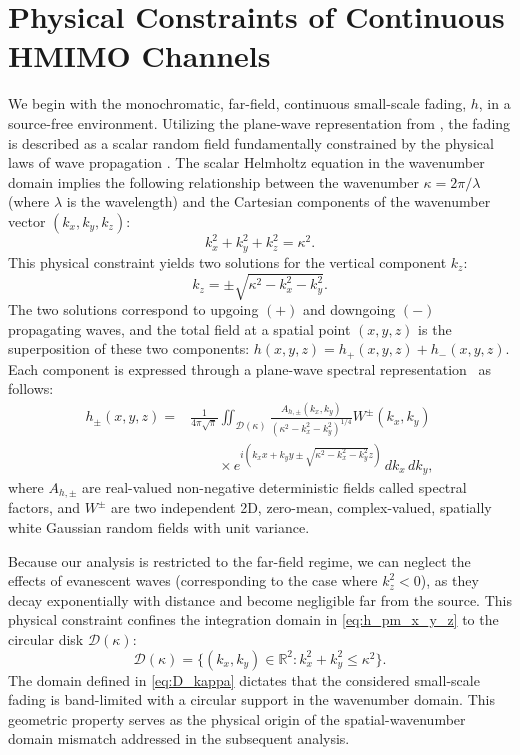 \documentclass[lettersize,journal]{IEEEtran}
\theoremstyle{plain}
\begin{document}
\section{Physical Constraints of Continuous HMIMO Channels}
\label{sec:Continuous small-scale fading model}
We begin with the monochromatic, far-field, continuous small-scale fading, $h$, in a source-free environment. Utilizing the plane-wave representation from \cite{Pizzo2020Spatially}, the fading is described as a scalar random field fundamentally constrained by the physical laws of wave propagation \cite{Paulraj2003Introduction}. The scalar Helmholtz equation in the wavenumber domain \cite{hildebrand1962advanced} implies the following relationship between the wavenumber $\kappa = 2\pi/\lambda$ (where $\lambda$ is the wavelength) and the Cartesian components of the wavenumber vector $(k_x, k_y, k_z)$:
$$
k_x^2 + k_y^2 + k_z^2 = \kappa^2.
\label{eq:k_x_k_y_k_z}
$$
This physical constraint yields two solutions for the vertical component $k_z$:
$$
k_z = \pm\sqrt{\kappa^2 - k_x^2 - k_y^2}.
\label{eq:k_z}
$$
The two solutions correspond to upgoing $(+)$ and downgoing $(-)$ propagating waves, and the total field at a spatial point $(x,y,z)$ is the superposition of these two components: $h(x, y, z) = h_{+}(x, y, z) + h_{-}(x, y, z)$. Each component is expressed through a plane-wave spectral representation~\cite{Pizzo2020Spatially} as follows:
\begin{align}
	h_{\pm}(x,y,z) = &\frac{1}{4\pi\sqrt{\pi}}\iint_{\mathcal{D}(\kappa)}\frac{A_{h,\pm}(k_x,k_y)}{(\kappa^2 - k_x^2 - k_y^2)^{1/4}}W^{\pm}(k_x, k_y) \nonumber \\
	&\qquad \times e^{i(k_x x + k_y y \pm \sqrt{\kappa^2 - k_x^2 -k_y^2}z)}\,dk_x\,dk_y,
	\label{eq:h_pm_x_y_z}
\end{align}
where $A_{h,\pm}$ are real-valued non-negative deterministic fields called spectral factors, and $W^{\pm}$ are two independent 2D, zero-mean, complex-valued, spatially white Gaussian random fields with unit variance. 
	
Because our analysis is restricted to the far-field regime, we can neglect the effects of evanescent waves (corresponding to the case where $k_z^2 < 0$), as they decay exponentially with distance and become negligible far from the source. This physical constraint confines the integration domain in \eqref{eq:h_pm_x_y_z} to the circular disk $\mathcal{D}(\kappa)$:
\begin{equation}
	\mathcal{D}(\kappa) = \{(k_x, k_y) \in \mathbb{R}^2: k_x^2 + k_y^2 \leq \kappa^2 \}.
	\label{eq:D_kappa}
\end{equation}
The domain defined in \eqref{eq:D_kappa} dictates that the considered small-scale fading is band-limited with a circular support in the wavenumber domain. This geometric property serves as the physical origin of the spatial-wavenumber domain mismatch addressed in the subsequent analysis.
	
\end{document}
